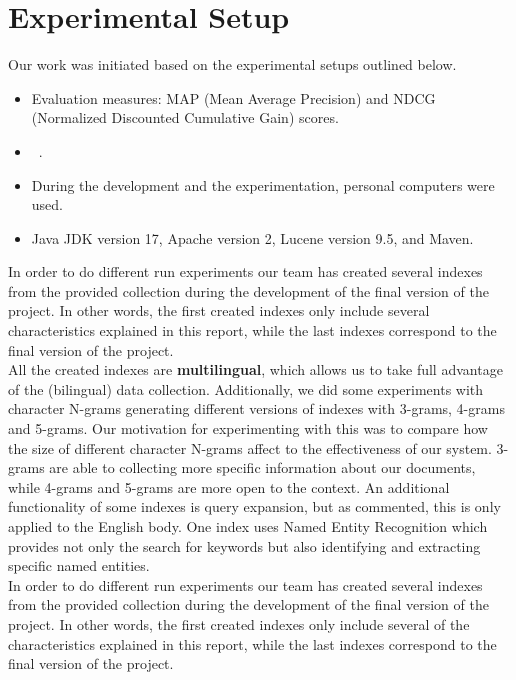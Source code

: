 \section{Experimental Setup}\label{sec:setup}

Our work was initiated based on the experimental setups outlined below.
\begin{itemize}
	\item Evaluation measures: MAP (Mean Average Precision) and NDCG (Normalized Discounted Cumulative Gain) scores.
	\item~\citep[Repository]{jihuming}.
	\item During the development and the experimentation, personal computers were used.
	\item Java JDK version 17, Apache version 2, Lucene version 9.5, and Maven.
\end{itemize}

In order to do different run experiments our team has created several indexes from the provided collection during the
development of the final version of the project.
In other words, the first created indexes only include several characteristics explained in this report, while the last
indexes correspond to the final version of the project.\\

All the created indexes are \textbf{multilingual}, which allows us to take full advantage of the (bilingual) data
collection.
Additionally, we did some experiments with character N-grams generating different versions of indexes with 3-grams,
4-grams and 5-grams.
Our motivation for experimenting with this was to compare how the size of different character N-grams affect to the
effectiveness of our system.
3-grams are able to collecting more specific information about our documents, while 4-grams and 5-grams are more open to
the context.
An additional functionality of some indexes is query expansion, but as commented, this is only applied to the English
body.
One index uses Named Entity Recognition which provides not only the search for keywords but also identifying and extracting
specific named entities.\\

In order to do different run experiments our team has created several indexes from the provided collection during the
development of the final version of the project.
In other words, the first created indexes only include several of the characteristics explained in this report, while
the last indexes correspond to the final version of the project.\\

